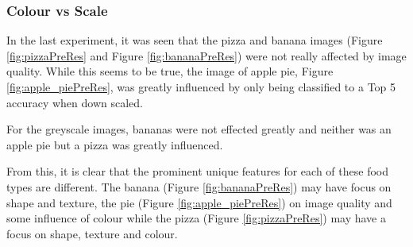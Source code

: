 \tocless\subsubsection{Colour vs Scale}
In the last experiment, it was seen that the pizza and banana images (Figure \ref{fig:pizzaPreRes} and Figure \ref{fig:bananaPreRes}) were not really affected by image quality. While this seems to be true, the image of apple pie, Figure \ref{fig:apple_piePreRes}, was greatly influenced by only being classified to a Top 5 accuracy when down scaled.

For the greyscale images, bananas were not effected greatly and neither was an apple pie but a pizza was greatly influenced.

From this, it is clear that the prominent unique features for each of these food types are different. The banana (Figure \ref{fig:bananaPreRes}) may have focus on shape and texture, the pie (Figure \ref{fig:apple_piePreRes}) on image quality and some influence of colour while the pizza (Figure \ref{fig:pizzaPreRes}) may have a focus on shape, texture and colour.

